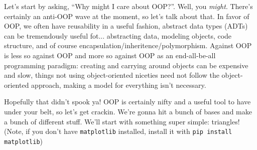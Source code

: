 \documentclass[11pt, twoside, reqno]{book}
\begin{document}
Let's start by asking, ``Why might I care about OOP?''. Well, you \textit{might}. There's certainly an anti-OOP wave at the moment, so let's talk about that. In favor of OOP, we often have reusability in a useful fashion, abstract data types (ADTs) can be tremendously useful fot... abstracting data, modeling objects, code structure, and of course encapsulation/inheritence/polymorphism. Against OOP is less so against OOP and more so against OOP as an end-all-be-all programming paradigm: creating and carrying around objects can be expensive and slow, things not using object-oriented niceties need not follow the object-oriented approach, making a model for everything isn't necessary.

Hopefully that didn't spook ya! OOP is certainly nifty and a useful tool to have under your belt, so let's get crackin. We're gonna hit a bunch of bases and make a bunch of different stuff. We'll start with something super simple: triangles! (Note, if you don't have \texttt{matplotlib} installed, install it with \texttt{pip install matplotlib})
\end{document}
